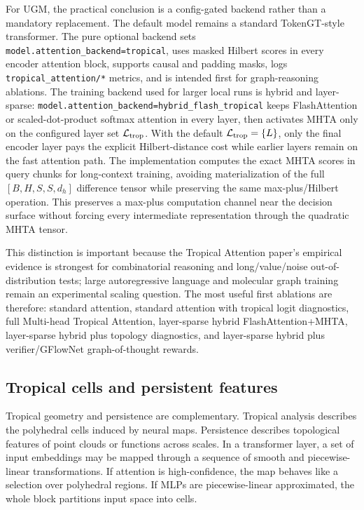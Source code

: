 \documentclass[11pt]{article}
\newcommand{\1}{\mathbf{1}}
\begin{document}
For UGM, the practical conclusion is a config-gated backend rather than a mandatory replacement. The default model remains a standard TokenGT-style transformer. The pure optional backend sets \texttt{model.attention\_backend=tropical}, uses masked Hilbert scores in every encoder attention block, supports causal and padding masks, logs \texttt{tropical\_attention/*} metrics, and is intended first for graph-reasoning ablations. The training backend used for larger local runs is hybrid and layer-sparse: \texttt{model.attention\_backend=hybrid\_flash\_tropical} keeps FlashAttention or scaled-dot-product softmax attention in every layer, then activates MHTA only on the configured layer set \(\mathcal L_{\rm trop}\). With the default \(\mathcal L_{\rm trop}=\{L\}\), only the final encoder layer pays the explicit Hilbert-distance cost while earlier layers remain on the fast attention path. The implementation computes the exact MHTA scores in query chunks for long-context training, avoiding materialization of the full \([B,H,S,S,d_h]\) difference tensor while preserving the same max-plus/Hilbert operation. This preserves a max-plus computation channel near the decision surface without forcing every intermediate representation through the quadratic MHTA tensor.

This distinction is important because the Tropical Attention paper's empirical evidence is strongest for combinatorial reasoning and long/value/noise out-of-distribution tests; large autoregressive language and molecular graph training remain an experimental scaling question. The most useful first ablations are therefore: standard attention, standard attention with tropical logit diagnostics, full Multi-head Tropical Attention, layer-sparse hybrid FlashAttention+MHTA, layer-sparse hybrid plus topology diagnostics, and layer-sparse hybrid plus verifier/GFlowNet graph-of-thought rewards.

\subsection{Tropical cells and persistent features}

Tropical geometry and persistence are complementary. Tropical analysis describes the polyhedral cells induced by neural maps. Persistence describes topological features of point clouds or functions across scales. In a transformer layer, a set of input embeddings may be mapped through a sequence of smooth and piecewise-linear transformations. If attention is high-confidence, the map behaves like a selection over polyhedral regions. If MLPs are piecewise-linear approximated, the whole block partitions input space into cells.
\end{document}
